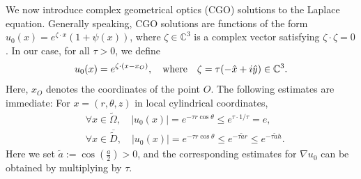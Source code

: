 ﻿\documentclass[11pt,reqno,oneside]{amsart}
\theoremstyle{definition}
\theoremstyle{remark}
\newcommand{\C}{\mathbb{C}}
\newcommand{\n}{\nabla}
\renewcommand{\t}{\theta}
\renewcommand{\O}{\Omega}
\newcommand{\ds}{\displaystyle}
\begin{document}
        \medskip

        We now introduce complex geometrical optics (CGO) solutions to the Laplace equation. Generally speaking, CGO solutions are functions of the form $u_0(x)=e^{\zeta\cdot x}(1+\psi(x))$, where $\zeta\in \C^3$ is a complex vector satisfying $\zeta\cdot \zeta=0$. In our case, for all $\tau>0$, we define
        \begin{align}\label{eq:CGO}
            u_0(x) = e^{\zeta\cdot (x-x_O)},\quad {\rm where}\quad \zeta =\tau(-\hat{x}+i\hat{y})\in \C^3.            
        \end{align}
        Here, $x_O$ denotes the coordinates of the point $O$. The following estimates are immediate: For $x=(r,\t,z)$ in local cylindrical coordinates,
        \begin{align*}
            &\forall x\in \widetilde{\O}, \quad |u_0(x)|=e^{-\tau r\cos \t} \leq e^{\tau \cdot 1/\tau}=e,\\
            &\forall x\in \overline{\widetilde{D}}, \quad |u_0(x)|=e^{-\tau r\cos \t} \leq e^{-\tau \widetilde{a} r}\leq e^{-\tau \widetilde{a}h}.
        \end{align*}
        Here we set $\ds \widetilde{a}:=\cos(\frac{a}{2})>0$, and the corresponding estimates for $\n u_0$ can be obtained by multiplying by $\tau$.
        \medskip
\end{document}
